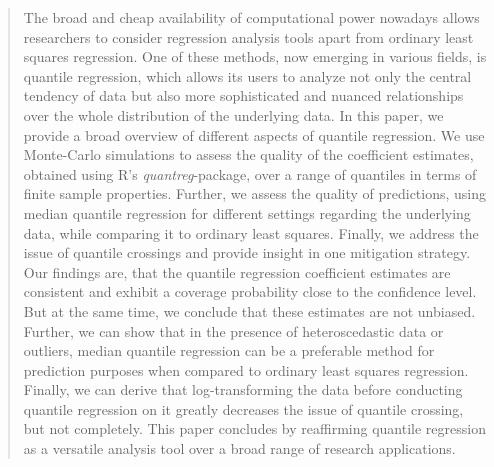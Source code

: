 \documentclass[conference]{IEEEtran}
\begin{document}
\begin{spacing}{1.5}
\begin{abstract}

The broad and cheap availability of computational power nowadays allows researchers to consider regression analysis tools apart from ordinary least squares regression. One of these methods, now emerging in various fields, is quantile regression, which allows its users to analyze not only the central tendency of data but also more sophisticated and nuanced relationships over the whole distribution of the underlying data.
In this paper, we provide a broad overview of different aspects of quantile regression.
We use Monte-Carlo simulations to assess the quality of the coefficient estimates, obtained using R's \textit{quantreg}-package, over a range of quantiles in terms of finite sample properties. Further, we assess the quality of predictions, using median quantile regression for different settings regarding the underlying data, while comparing it to ordinary least squares.
Finally, we address the issue of quantile crossings and provide insight in one mitigation strategy.
Our findings are, that the quantile regression coefficient estimates are consistent and exhibit a coverage probability close to the confidence level. But at the same time, we conclude that these estimates are not unbiased. Further, we can show that in the presence of heteroscedastic data or outliers, median quantile regression can be a preferable method for prediction purposes when compared to ordinary least squares regression.
Finally, we can derive that log-transforming the data before conducting quantile regression on it greatly decreases the issue of quantile crossing, but not completely.
This paper concludes by reaffirming quantile regression as a versatile analysis tool over a broad range of research applications.

\end{abstract}


\end{spacing}
\end{document}
